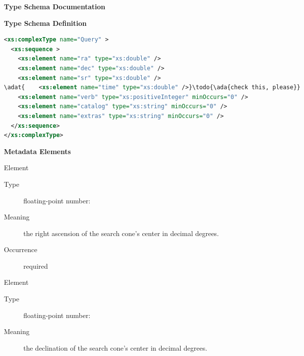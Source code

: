 \documentclass[11pt,a4paper]{ivoa}
\newcommand\ada[1]{\textcolor{blue}{\textbf{#1}}}
\begin{document}
\begin{generated}
\begingroup
      	\renewcommand*\descriptionlabel[1]{%
				\hbox to
5.5em{\emph{#1}\hfil}}\vspace{2ex}\noindent\textbf{ Type
Schema Documentation}


\vspace{1ex}\noindent\textbf{ Type Schema Definition}

\begin{lstlisting}[language=XML,basicstyle=\footnotesize]
<xs:complexType name="Query" >
  <xs:sequence >
    <xs:element name="ra" type="xs:double" />
    <xs:element name="dec" type="xs:double" />
    <xs:element name="sr" type="xs:double" />
\adat{    <xs:element name="time" type="xs:double" />}\todo{\ada{check this, please}}
    <xs:element name="verb" type="xs:positiveInteger" minOccurs="0" />
    <xs:element name="catalog" type="xs:string" minOccurs="0" />
    <xs:element name="extras" type="xs:string" minOccurs="0" />
  </xs:sequence>
</xs:complexType>
\end{lstlisting}

\vspace{0.5ex}\noindent\textbf{ Metadata Elements}

\begingroup\small\begin{bigdescription}\item[Element \xmlel{ra}]
\begin{description}
\item[Type] floating-point number: 
\item[Meaning] 
                   the right ascension of the search cone's center in
                   decimal degrees.  
               
\item[Occurrence] required

\end{description}
\item[Element \xmlel{dec}]
\begin{description}
\item[Type] floating-point number: 
\item[Meaning] 
                   the declination of the search cone's center in
                   decimal degrees.  
               

\end{description}
\end{bigdescription}
\end{generated}
\end{document}
